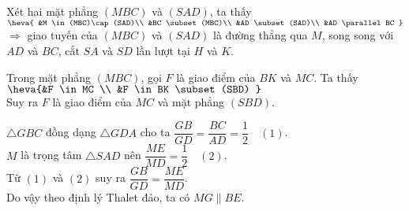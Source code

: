 \begin{bt}
{\begin{center}
\end{center}
\begin{listEX}[1]
	\item Xét hai mặt phẳng $ (MBC) $ và $ (SAD) $, ta thấy
	$
		\heva{
			&M \in (MBC)\cap (SAD)\\
			&BC \subset (MBC)\\
			&AD \subset (SAD)\\
			&AD \parallel BC
		}
	$
	\\
	$ \Rightarrow $ giao tuyến của $ (MBC) $ và $ (SAD) $ là đường thẳng qua $ M $, song song với $ AD $ và $ BC $, cắt $ SA $ và $ SD $ lần lượt tại $ H $ và $ K $.
	\item Trong mặt phẳng $ (MBC) $, gọi $ F $ là giao điểm của $ BK $ và $ MC $.
	Ta thấy	$\heva{&F \in MC \\ &F \in BK \subset (SBD) }	$
	\\
	Suy ra $ F $ là giao điểm của $ MC $ và mặt phẳng $ (SBD) $.
	\item $ \triangle GBC $ đồng dạng $ \triangle GDA $ cho ta
	$\dfrac{GB}{GD} = \dfrac{BC}{AD} = \dfrac{1}{2} \quad (1)$.\\
	$ M $ là trọng tâm $ \triangle SAD $ nên $\dfrac{ME}{MD} = \dfrac{1}{2} \quad (2)$.\\
	Từ $ (1) $ và $ (2) $ suy ra $ \dfrac{GB}{GD} = \dfrac{ME}{MD} $. 
	\\
	Do vậy theo định lý Thalet đảo, ta có $ MG \parallel BE$.
\end{listEX}
}
\end{bt}

